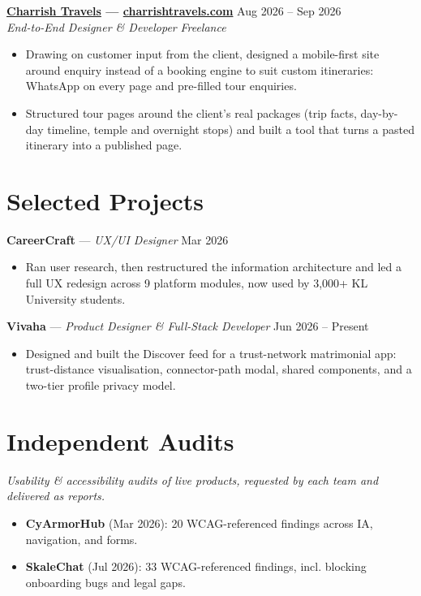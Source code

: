\documentclass[11pt,letterpaper]{article}
\newcommand{\project}[3]{%
	\noindent\textbf{#1} --- \textit{#2} \hfill #3
}
\newcommand{\role}[4]{%
	\noindent\textbf{#1} \hfill #2\\
	\textit{#3} \hfill \textit{#4}
}
\begin{document}
\role{\href{https://charrishtravels.com}{Charrish Travels} --- \href{https://charrishtravels.com}{\normalfont charrishtravels.com}}{Aug 2026 -- Sep 2026}{End-to-End Designer \& Developer}{Freelance}
\begin{itemize}
	\item Drawing on customer input from the client, designed a mobile-first site around enquiry instead of a booking engine to suit custom itineraries: WhatsApp on every page and pre-filled tour enquiries.
	\item Structured tour pages around the client's real packages (trip facts, day-by-day timeline, temple and overnight stops) and built a tool that turns a pasted itinerary into a published page.
\end{itemize}

\section*{Selected Projects}

\project{CareerCraft}{UX/UI Designer}{Mar 2026}
\begin{itemize}
	\item Ran user research, then restructured the information architecture and led a full UX redesign across 9 platform modules, now used by 3,000+ KL University students.
\end{itemize}

\project{Vivaha}{Product Designer \& Full-Stack Developer}{Jun 2026 -- Present}
\begin{itemize}
	\item Designed and built the Discover feed for a trust-network matrimonial app: trust-distance visualisation, connector-path modal, shared components, and a two-tier profile privacy model.
\end{itemize}

\section*{Independent Audits}
\textit{Usability \& accessibility audits of live products, requested by each team and delivered as reports.}
\begin{itemize}
	\item \textbf{CyArmorHub} (Mar 2026): 20 WCAG-referenced findings across IA, navigation, and forms.
	\item \textbf{SkaleChat} (Jul 2026): 33 WCAG-referenced findings, incl. blocking onboarding bugs and legal gaps.
\end{itemize}
\end{document}
